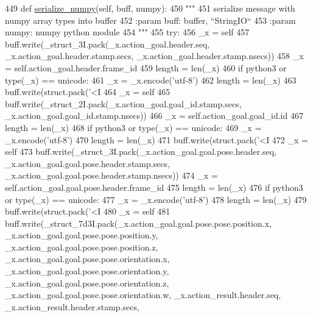 \begin{DoxyCode}
449   \textcolor{keyword}{def }\hyperlink{classjaco__msgs_1_1msg_1_1__ArmPoseAction_1_1ArmPoseAction_a91509d4135ea5cce376ed8e089cdbd1f}{serialize\_numpy}(self, buff, numpy):
450     \textcolor{stringliteral}{"""}
451 \textcolor{stringliteral}{    serialize message with numpy array types into buffer}
452 \textcolor{stringliteral}{    :param buff: buffer, ``StringIO``}
453 \textcolor{stringliteral}{    :param numpy: numpy python module}
454 \textcolor{stringliteral}{    """}
455     \textcolor{keywordflow}{try}:
456       \_x = self
457       buff.write(\_struct\_3I.pack(\_x.action\_goal.header.seq, \_x.action\_goal.header.stamp.secs, 
      \_x.action\_goal.header.stamp.nsecs))
458       \_x = self.action\_goal.header.frame\_id
459       length = len(\_x)
460       \textcolor{keywordflow}{if} python3 \textcolor{keywordflow}{or} type(\_x) == unicode:
461         \_x = \_x.encode(\textcolor{stringliteral}{'utf-8'})
462         length = len(\_x)
463       buff.write(struct.pack(\textcolor{stringliteral}{'<I%
464       \_x = self
465       buff.write(\_struct\_2I.pack(\_x.action\_goal.goal\_id.stamp.secs, \_x.action\_goal.goal\_id.stamp.nsecs))
466       \_x = self.action\_goal.goal\_id.id
467       length = len(\_x)
468       \textcolor{keywordflow}{if} python3 \textcolor{keywordflow}{or} type(\_x) == unicode:
469         \_x = \_x.encode(\textcolor{stringliteral}{'utf-8'})
470         length = len(\_x)
471       buff.write(struct.pack(\textcolor{stringliteral}{'<I%
472       \_x = self
473       buff.write(\_struct\_3I.pack(\_x.action\_goal.goal.pose.header.seq, 
      \_x.action\_goal.goal.pose.header.stamp.secs, \_x.action\_goal.goal.pose.header.stamp.nsecs))
474       \_x = self.action\_goal.goal.pose.header.frame\_id
475       length = len(\_x)
476       \textcolor{keywordflow}{if} python3 \textcolor{keywordflow}{or} type(\_x) == unicode:
477         \_x = \_x.encode(\textcolor{stringliteral}{'utf-8'})
478         length = len(\_x)
479       buff.write(struct.pack(\textcolor{stringliteral}{'<I%
480       \_x = self
481       buff.write(\_struct\_7d3I.pack(\_x.action\_goal.goal.pose.pose.position.x, 
      \_x.action\_goal.goal.pose.pose.position.y, \_x.action\_goal.goal.pose.pose.position.z, \_x.action\_goal.goal.pose.pose.orientation.x, 
      \_x.action\_goal.goal.pose.pose.orientation.y, \_x.action\_goal.goal.pose.pose.orientation.z, 
      \_x.action\_goal.goal.pose.pose.orientation.w, \_x.action\_result.header.seq, \_x.action\_result.header.stamp.secs, 
}}}
\end{DoxyCode}
